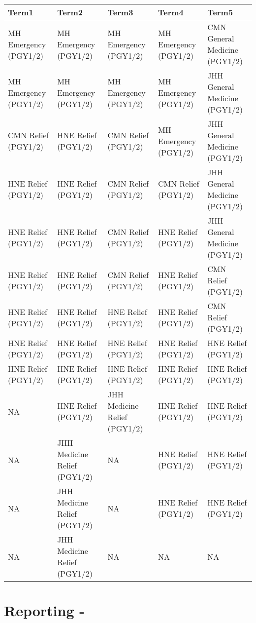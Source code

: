\documentclass[
]{article}
\begin{document}
\begin{longtable}{lllll}
\toprule
Term1 & Term2 & Term3 & Term4 & Term5 \\ 
\midrule\addlinespace[2.5pt]
MH Emergency (PGY1/2) & MH Emergency (PGY1/2) & MH Emergency (PGY1/2) & MH Emergency (PGY1/2) & CMN General Medicine (PGY1/2) \\ 
MH Emergency (PGY1/2) & MH Emergency (PGY1/2) & MH Emergency (PGY1/2) & MH Emergency (PGY1/2) & JHH General Medicine (PGY1/2) \\ 
CMN Relief (PGY1/2) & HNE Relief (PGY1/2) & CMN Relief (PGY1/2) & MH Emergency (PGY1/2) & JHH General Medicine (PGY1/2) \\ 
HNE Relief (PGY1/2) & HNE Relief (PGY1/2) & CMN Relief (PGY1/2) & CMN Relief (PGY1/2) & JHH General Medicine (PGY1/2) \\ 
HNE Relief (PGY1/2) & HNE Relief (PGY1/2) & CMN Relief (PGY1/2) & HNE Relief (PGY1/2) & JHH General Medicine (PGY1/2) \\ 
HNE Relief (PGY1/2) & HNE Relief (PGY1/2) & CMN Relief (PGY1/2) & HNE Relief (PGY1/2) & CMN Relief (PGY1/2) \\ 
HNE Relief (PGY1/2) & HNE Relief (PGY1/2) & HNE Relief (PGY1/2) & HNE Relief (PGY1/2) & CMN Relief (PGY1/2) \\ 
HNE Relief (PGY1/2) & HNE Relief (PGY1/2) & HNE Relief (PGY1/2) & HNE Relief (PGY1/2) & HNE Relief (PGY1/2) \\ 
HNE Relief (PGY1/2) & HNE Relief (PGY1/2) & HNE Relief (PGY1/2) & HNE Relief (PGY1/2) & HNE Relief (PGY1/2) \\ 
NA & HNE Relief (PGY1/2) & JHH Medicine Relief (PGY1/2) & HNE Relief (PGY1/2) & HNE Relief (PGY1/2) \\ 
NA & JHH Medicine Relief (PGY1/2) & NA & HNE Relief (PGY1/2) & HNE Relief (PGY1/2) \\ 
NA & JHH Medicine Relief (PGY1/2) & NA & HNE Relief (PGY1/2) & HNE Relief (PGY1/2) \\ 
NA & JHH Medicine Relief (PGY1/2) & NA & NA & NA \\ 
\bottomrule
\end{longtable}

\hypertarget{reporting--}{%
\section{Reporting -}\label{reporting--}}
\end{document}
